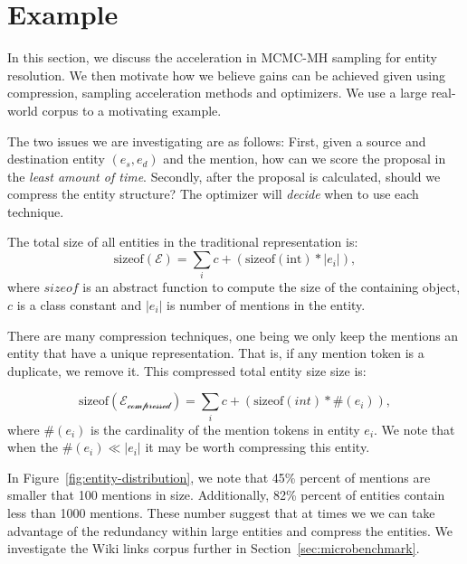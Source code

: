 
\section{Example}
\label{sec:optimizer:example}

In this section, we discuss the acceleration in MCMC-MH sampling for entity resolution.
We then motivate how we believe gains can be achieved given using compression,
sampling acceleration methods and optimizers.
We use a large real-world corpus to a motivating example.

The two issues we are investigating are as follows:
First, given a source and 
destination entity \((e_s, e_d)\) and the mention, how can we score the proposal in the \textit{least amount of time}.
Secondly, after the proposal is calculated, should we compress the entity structure?
The optimizer will \textit{decide} when to use each technique.

The total size of all entities in the traditional representation is:
\begin{equation}
  \text{sizeof}(\mathcal{E}) =  \sum_i c + (\text{sizeof}(\text{int}) * |e_i|),
\end{equation}
where $sizeof$ is an abstract function to compute the size of the containing object,
$c$ is a class constant and $|e_i|$ is number of mentions in the entity.

There are many compression techniques, one being we only keep the mentions an entity
that have a unique representation.
That is, if any mention token is a duplicate, we remove it.
This compressed total entity size size is:

\begin{equation}
  \text{sizeof}(\mathcal{E_\text{compressed}}) = \sum_i c + (\text{sizeof}(int) * \#(e_i) ),
\end{equation}
where $\#(e_i)$ is the cardinality of the mention tokens in entity $e_i$.
We note that when the $\#(e_i) \ll |e_i|$ it may be worth compressing this entity.


In Figure~\ref{fig:entity-distribution}, we note that
45\% percent of mentions are smaller that 100 mentions in size.
Additionally, 82\% percent of entities contain less than 1000 mentions.
These number suggest that at times we we can take advantage of the redundancy within
large entities and compress the entities.
We investigate the Wiki links corpus further in Section~\ref{sec:microbenchmark}. 


